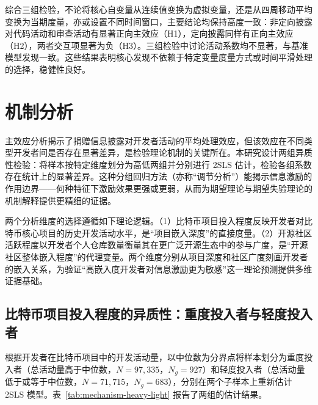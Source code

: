 综合三组检验，不论将核心自变量从连续值变换为虚拟变量，还是从四周移动平均变换为当期度量，亦或设置不同时间窗口，主要结论均保持高度一致：非定向披露对代码活动和审查活动有显著正向主效应（H1），定向披露同样有正向主效应（H2），两者交互项显著为负（H3）。三组检验中讨论活动系数均不显著，与基准模型发现一致。这些结果表明核心发现不依赖于特定变量度量方式或时间平滑处理的选择，稳健性良好。

\section{机制分析}
\label{sec:mechanism-1}

主效应分析揭示了捐赠信息披露对开发者活动的平均处理效应，但该效应在不同类型开发者间是否存在显著差异，是检验理论机制的关键所在。本研究设计两组异质性检验：将样本按特定维度划分为高低两组并分别进行 2SLS 估计，检验各组系数存在统计上的显著差异。这种分组回归方法（亦称“调节分析”）能揭示信息激励的作用边界——何种特征下激励效果更强或更弱，从而为期望理论与期望失验理论的机制解释提供更精细的证据。

两个分析维度的选择遵循如下理论逻辑。（1）比特币项目投入程度反映开发者对比特币核心项目的历史开发活动水平，是“项目嵌入深度”的直接度量。（2）开源社区活跃程度以开发者个人仓库数量衡量其在更广泛开源生态中的参与广度，是“开源社区整体嵌入程度”的代理变量。两个维度分别从项目深度和社区广度刻画开发者的嵌入关系，为验证“高嵌入度开发者对信息激励更为敏感”这一理论预测提供多维证据基础。

\subsection{比特币项目投入程度的异质性：重度投入者与轻度投入者}

根据开发者在比特币项目中的开发活动量，以中位数为分界点将样本划分为重度投入者（总活动量高于中位数，$N = 97{,}335$，$N_g = 927$）和轻度投入者（总活动量低于或等于中位数，$N = 71{,}715$，$N_g = 683$），分别在两个子样本上重新估计 2SLS 模型。表~\ref{tab:mechanism-heavy-light} 报告了两组的估计结果。

